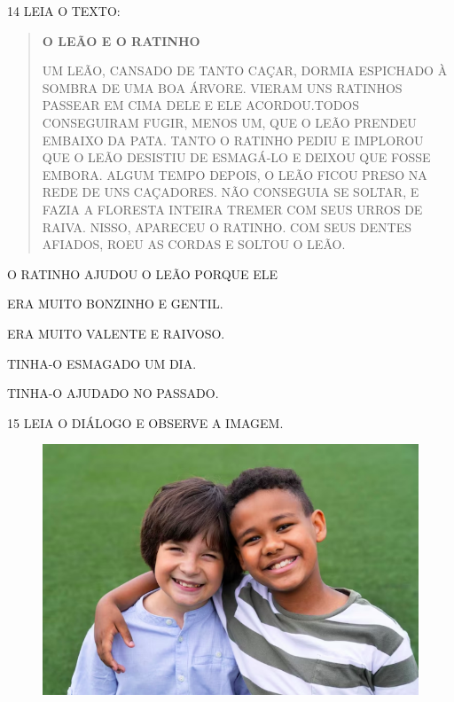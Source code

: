 \num{14} LEIA O TEXTO:

\begin{quote}
\textbf{O LEÃO E O RATINHO}

UM LEÃO, CANSADO DE TANTO CAÇAR, DORMIA ESPICHADO À SOMBRA
DE UMA BOA ÁRVORE. VIERAM UNS RATINHOS PASSEAR EM CIMA DELE
E ELE ACORDOU.TODOS CONSEGUIRAM FUGIR, MENOS UM, QUE O LEÃO
PRENDEU EMBAIXO DA PATA. TANTO O RATINHO PEDIU E IMPLOROU
QUE O LEÃO DESISTIU DE ESMAGÁ-LO E DEIXOU QUE FOSSE EMBORA.
ALGUM TEMPO DEPOIS, O LEÃO FICOU PRESO NA REDE DE
UNS CAÇADORES. NÃO CONSEGUIA SE SOLTAR, E FAZIA A FLORESTA
INTEIRA TREMER COM SEUS URROS DE RAIVA.
NISSO, APARECEU O RATINHO. COM SEUS DENTES AFIADOS,
ROEU AS CORDAS E SOLTOU O LEÃO.

\end{quote}

O RATINHO AJUDOU O LEÃO PORQUE ELE

\begin{escolha}
\item ERA MUITO BONZINHO E GENTIL.

\item ERA MUITO VALENTE E RAIVOSO.

\item TINHA-O ESMAGADO UM DIA.

\item TINHA-O AJUDADO NO PASSADO.
\end{escolha}

\pagebreak
\num{15} LEIA O DIÁLOGO E OBSERVE A IMAGEM.

\begin{figure}[htpb]
\centering
\includegraphics[width=\textwidth]{media/image220b.png}
\end{figure}

